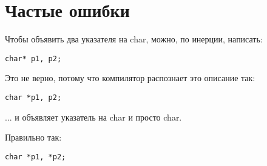 ﻿\section{Частые ошибки}

Чтобы объявить два указателя на char, можно, по инерции, написать:

\begin{lstlisting}
char* p1, p2;
\end{lstlisting}

Это не верно, потому что компилятор распознает это описание так:

\begin{lstlisting}
char *p1, p2;
\end{lstlisting}

... и объявляет указатель на char и просто char.

Правильно так:

\begin{lstlisting}
char *p1, *p2;
\end{lstlisting}
